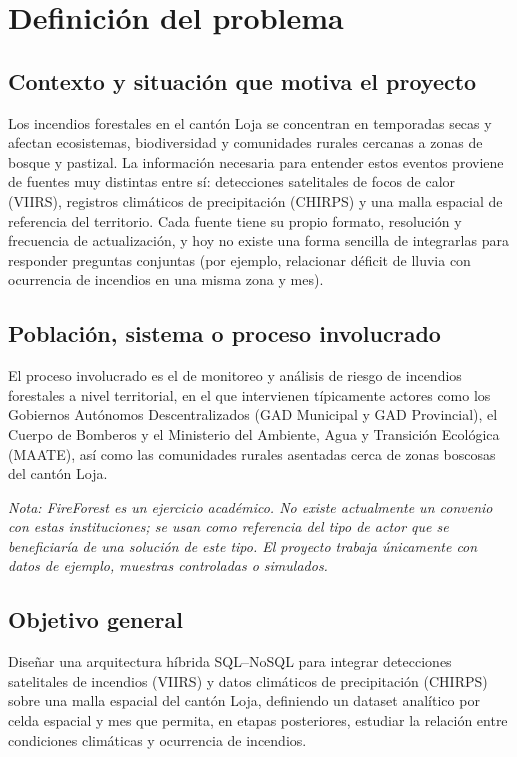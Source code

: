 \documentclass[11pt,a4paper]{article}
\begin{document}
\section{Definici\'on del problema}

\subsection{Contexto y situaci\'on que motiva el proyecto}

Los incendios forestales en el cant\'on Loja se concentran en temporadas secas y afectan ecosistemas, biodiversidad y comunidades rurales cercanas a zonas de bosque y pastizal. La informaci\'on necesaria para entender estos eventos proviene de fuentes muy distintas entre s\'i: detecciones satelitales de focos de calor (VIIRS), registros clim\'aticos de precipitaci\'on (CHIRPS) y una malla espacial de referencia del territorio. Cada fuente tiene su propio formato, resoluci\'on y frecuencia de actualizaci\'on, y hoy no existe una forma sencilla de integrarlas para responder preguntas conjuntas (por ejemplo, relacionar d\'eficit de lluvia con ocurrencia de incendios en una misma zona y mes).

\subsection{Poblaci\'on, sistema o proceso involucrado}

El proceso involucrado es el de monitoreo y an\'alisis de riesgo de incendios forestales a nivel territorial, en el que intervienen t\'ipicamente actores como los Gobiernos Aut\'onomos Descentralizados (GAD Municipal y GAD Provincial), el Cuerpo de Bomberos y el Ministerio del Ambiente, Agua y Transici\'on Ecol\'ogica (MAATE), as\'i como las comunidades rurales asentadas cerca de zonas boscosas del cant\'on Loja.

\textit{Nota: FireForest es un ejercicio acad\'emico. No existe actualmente un convenio con estas instituciones; se usan como referencia del tipo de actor que se beneficiar\'ia de una soluci\'on de este tipo. El proyecto trabaja \'unicamente con datos de ejemplo, muestras controladas o simulados.}

\subsection{Objetivo general}

Dise\~nar una arquitectura h\'ibrida SQL--NoSQL para integrar detecciones satelitales de incendios (VIIRS) y datos clim\'aticos de precipitaci\'on (CHIRPS) sobre una malla espacial del cant\'on Loja, definiendo un dataset anal\'itico por celda espacial y mes que permita, en etapas posteriores, estudiar la relaci\'on entre condiciones clim\'aticas y ocurrencia de incendios.
\end{document}

